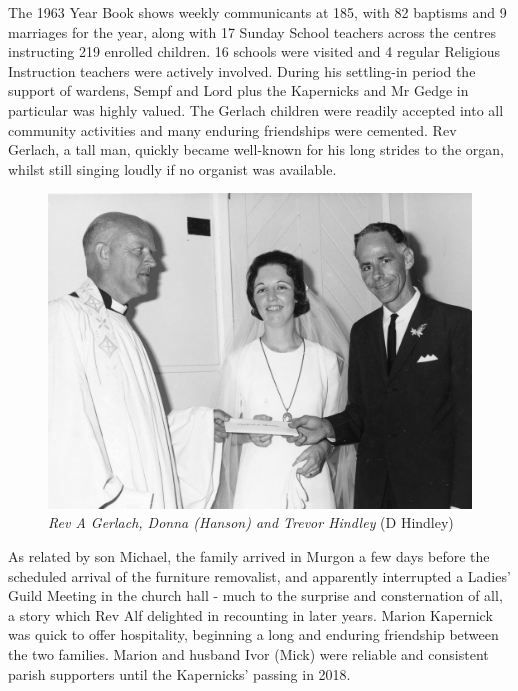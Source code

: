 The 1963 Year Book shows weekly communicants at 185, with 82 baptisms and 9 marriages for the year, along with 17 Sunday School teachers across the centres instructing 219 enrolled children. 16 schools were visited and 4 regular Religious Instruction teachers were actively involved. During his settling-in period the support of wardens, Sempf and Lord plus the Kapernicks and Mr Gedge in particular was highly valued. The Gerlach children were readily accepted into all community activities and many enduring friendships were cemented. Rev Gerlach, a tall man, quickly became well-known for his long strides to the organ, whilst still singing loudly if no organist was available.









\begin{figure}
\begin{center}
\includegraphics[width=1.\linewidth,center]{../images/donnaVestry.jpg}
\caption{{\itshape Rev A Gerlach, Donna (Hanson) and Trevor Hindley} {\scriptsize(D Hindley)}}
\end{center}
\end{figure}




As related by son Michael, the family arrived in Murgon a few days before the scheduled arrival of the furniture removalist, and apparently interrupted a Ladies' Guild Meeting in the church hall - much to the surprise and consternation of all, a story which Rev Alf delighted in recounting in later years. Marion Kapernick was quick to offer hospitality, beginning a long and enduring friendship between the two families. Marion and husband Ivor (Mick) were reliable and consistent parish supporters until the Kapernicks' passing in 2018.



